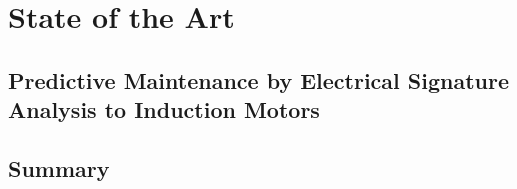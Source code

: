 \chapter{State of the Art}
\label{cha:users_manual}


\section{Predictive Maintenance by Electrical Signature Analysis to Induction Motors} %
\label{sec:predictive_maintenance_by_eletrical_signature_analysis}

\section{Summary} %
\label{sec:related_work_summary}
